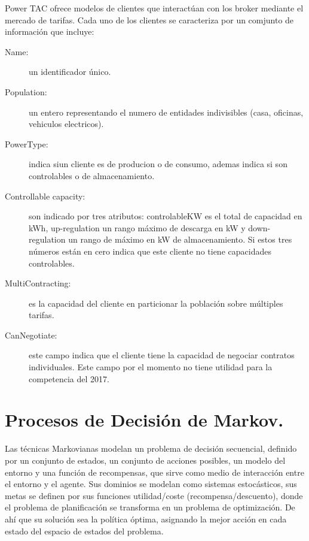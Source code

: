 Power TAC ofrece modelos de clientes que interactúan con los broker mediante el mercado de tarifas. Cada uno de los clientes se caracteriza por un comjunto de información que incluye:

\begin{description}
  \item[Name:] un identificador único.
  \item[Population:] un entero representando el numero de entidades indivisibles (casa, oficinas, vehiculos electricos).
  \item[PowerType:] indica siun cliente es de producion o de consumo, ademas indica si  son controlables o de almacenamiento.
  \item[Controllable capacity:] son indicado por tres atributos: controlableKW  es el total de capacidad en kWh, up-regulation un rango máximo de descarga en kW y down-regulation un rango de máximo en kW de almacenamiento. Si estos tres números están en cero indica que este cliente no tiene capacidades controlables.
  \item[MultiContracting:] es la capacidad del cliente en particionar la población sobre múltiples tarifas.
  \item[CanNegotiate:] este campo indica que el cliente tiene la capacidad de negociar contratos individuales. Este campo por el momento no tiene utilidad para la competencia del 2017.
\end{description}







\section{Procesos de Decisión de Markov.}
Las técnicas Markovianas modelan un problema de decisión secuencial, definido por un conjunto de estados, un conjunto de acciones posibles, un modelo del entorno y una función de recompensas, que sirve como medio de interacción entre el entorno y el agente. Sus dominios se modelan como sistemas estocásticos, sus metas se definen por sus funciones utilidad/coste (recompensa/descuento), donde el problema de planificación se transforma en un problema de optimización. De ahí que su solución sea la política óptima, asignando la mejor acción en cada estado del espacio de estados del problema.\\

